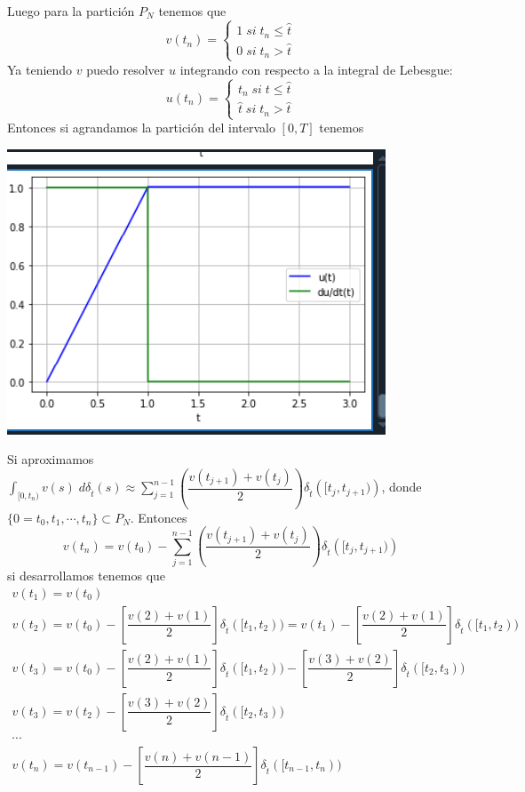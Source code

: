 \begin{example}
Luego para la partición $P_N$ tenemos que
	 \begin{equation*}
		v(t_n)=\left\lbrace \begin{array}{l}
			1 \; si \; t_n\leq \hat{t}\\
			0 \; si \; t_n> \hat{t}
		\end{array}\right. 
	\end{equation*} 
Ya teniendo $v$ puedo resolver $u$ integrando con respecto a la integral de Lebesgue:
	 \begin{equation*}
	u(t_n)=\left\lbrace \begin{array}{l}
		t _n\; si \; t\leq \hat{t}\\
		\hat{t} \; si \; t_n> \hat{t}
	\end{array}\right. 
\end{equation*} 
Entonces si agrandamos la partición del intervalo $[0,T]$ tenemos 
\begin{center}
		\includegraphics[width=0.7\linewidth]{fig3}
\end{center}
\vspace{0.2cm}
	
 Si aproximamos $\displaystyle\int_{[0,t_n)}v(s) \; d\delta_{\hat{t}}(s) \approx \sum_{j=1}^{n-1}\left( \dfrac{v(t_{j+1})+v(t_j)}{2}\right) \delta_{\hat{t}}\left( [t_j,t_{j+1})\right) $, donde $\{0=t_0,t_1,\cdots , t_n\}\subset P_N$. Entonces 
\begin{equation*}
	v(t_n)=v(t_0)-\sum_{j=1}^{n-1}\left( \dfrac{v(t_{j+1})+v(t_j)}{2}\right) \delta_{\hat{t}}\left( [t_j,t_{j+1})\right)
\end{equation*}
si desarrollamos tenemos que
$$\begin{array}{l}
	v(t_1)=v(t_0)\\
	v(t_2)=v(t_0)-\left[ \dfrac{v(2)+v(1)}{2}\right] \delta_{\hat{t}}([t_1,t_2))=v(t_1)-\left[ \dfrac{v(2)+v(1)}{2}\right] \delta_{\hat{t}}([t_1,t_2))\\
	v(t_3)=v(t_0)-\left[ \dfrac{v(2)+v(1)}{2}\right]\delta_{\hat{t}}([t_1,t_2))-\left[ \dfrac{v(3)+v(2)}{2}\right]\delta_{\hat{t}}([t_2,t_3))\\
	v(t_3)=v(t_2)-\left[ \dfrac{v(3)+v(2)}{2}\right]\delta_{\hat{t}}([t_2,t_3))\\
	\cdots\\
	v(t_n)=v(t_{n-1})-\left[ \dfrac{v(n)+v(n-1)}{2}\right] \delta_{\hat{t}}([t_{n-1},t_{n}))
\end{array}$$


\end{example}
